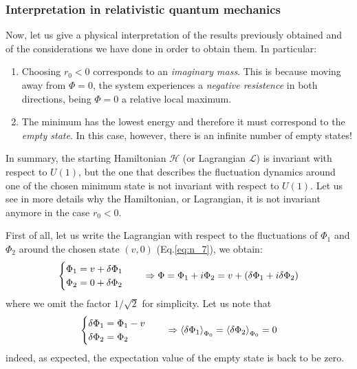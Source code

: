 \documentclass[../main/main.tex]{subfiles}
\begin{document}
\subsubsection{Interpretation in relativistic quantum mechanics}

Now, let us give a physical interpretation of the results previously obtained and of the considerations we have done in order to obtain them. In particular:

\begin{enumerate}
\item Choosing \( r_0 <0 \) corresponds to an \emph{imaginary mass}. This is because moving away from \( \Phi =0 \), the system experiences a \emph{negative resistence} in both directions, being \( \Phi =0 \) a relative local maximum.

\item The minimum has the lowest energy and therefore it must correspond to the \emph{empty state}.
In this case, however, there is an infinite number of empty states!

\end{enumerate}

In summary, the starting Hamiltonian \( \mathcal{H} \) (or Lagrangian \( \mathcal{L} \)) is invariant with respect to \( U(1) \), but the one that describes the fluctuation dynamics around one of the chosen minimum state is not invariant with respect to \( U(1) \). Let us see in more details why the Hamiltonian, or Lagrangian, it is not invariant anymore in the case \( r_0 <0 \).

First of all, let us write the Lagrangian with respect to the fluctuations of \( \Phi _1  \)  and \( \Phi _2 \) around the chosen state \( (v,0) \) (Eq.\eqref{eq:n_7}), we obtain:
\begin{equation*}
  \begin{cases}
   \Phi _1 = v + \delta \Phi _1\\
   \Phi _2 = 0 + \delta \Phi _2
  \end{cases}
  \quad \Rightarrow \Phi = \Phi _1 + i\Phi _2 = v + \qty(\delta \Phi _1 + i \delta \Phi _2)
\end{equation*}
where we omit the factor \( 1/\sqrt{2}  \) for simplicity. Let us note that
\begin{equation*}
  \begin{cases}
   \delta \Phi _1 = \Phi _1 - v\\
   \delta \Phi _2 = \Phi _2
  \end{cases}
  \quad \Rightarrow
  \expval{\delta \Phi _1} _{\Phi _0 } = \expval{\delta \Phi _2}_{\Phi _0} = 0
\end{equation*}
indeed, as expected, the expectation value of the empty state is back to be zero.
\end{document}
